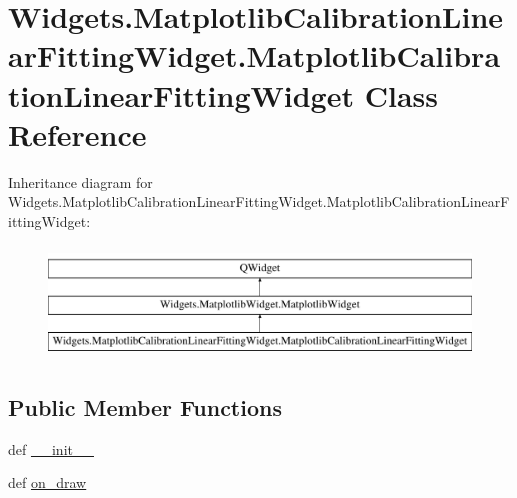 \hypertarget{classWidgets_1_1MatplotlibCalibrationLinearFittingWidget_1_1MatplotlibCalibrationLinearFittingWidget}{\section{Widgets.\-Matplotlib\-Calibration\-Linear\-Fitting\-Widget.\-Matplotlib\-Calibration\-Linear\-Fitting\-Widget Class Reference}
\label{classWidgets_1_1MatplotlibCalibrationLinearFittingWidget_1_1MatplotlibCalibrationLinearFittingWidget}
}
Inheritance diagram for Widgets.\-Matplotlib\-Calibration\-Linear\-Fitting\-Widget.\-Matplotlib\-Calibration\-Linear\-Fitting\-Widget\-:\begin{figure}[H]
\begin{center}
\leavevmode
\includegraphics[height=3.000000cm]{classWidgets_1_1MatplotlibCalibrationLinearFittingWidget_1_1MatplotlibCalibrationLinearFittingWidget}
\end{center}
\end{figure}
\subsection*{Public Member Functions}
\begin{DoxyCompactItemize}
\item 
def \hyperlink{classWidgets_1_1MatplotlibCalibrationLinearFittingWidget_1_1MatplotlibCalibrationLinearFittingWidget_acd2ccb87257c23aa05ce9248cc9eada0}{\-\_\-\-\_\-init\-\_\-\-\_\-}
\item 
def \hyperlink{classWidgets_1_1MatplotlibCalibrationLinearFittingWidget_1_1MatplotlibCalibrationLinearFittingWidget_a860451c4955757770f9b291d8b35760c}{on\-\_\-draw}
\end{DoxyCompactItemize}
